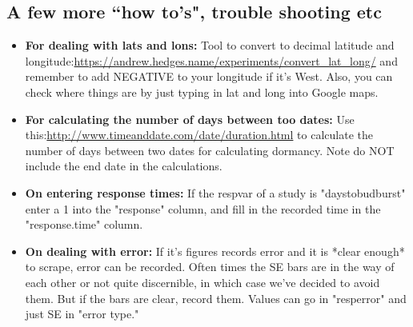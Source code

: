 \documentclass{article}\usepackage[]{graphicx}\usepackage[]{color}
\begin{document}
\subsection*{A few more ``how to's", trouble shooting etc} 
 \begin{itemize}
 \item \textbf{For dealing with lats and lons:} Tool to convert to decimal latitude and longitude:\url{https://andrew.hedges.name/experiments/convert_lat_long/}  and remember to add NEGATIVE to your longitude if it's West. Also, you can check where things are by just typing in lat and long into Google maps.
\item \textbf{ For calculating the number of days between too dates:} Use this:\url{http://www.timeanddate.com/date/duration.html} to calculate the number of days between two dates for calculating dormancy. Note do NOT include the end date in the calculations.
\item \textbf{On entering response times:} If the respvar of a study is "daystobudburst" enter a 1 into the "response" column, and fill in the recorded time in the "response.time" column.
\item \textbf{On dealing with error:} If it's figures records error and it is *clear enough* to scrape, error can be recorded. Often times the SE bars are in the way of each other or not quite discernible, in which case we've decided to avoid them. But if the bars are clear, record them. Values can go in "resp\textundersccore error" and just SE in "error type."
\end{itemize}
\end{document}
